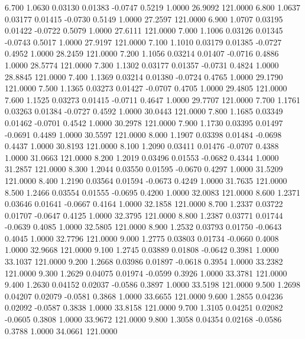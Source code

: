    6.700   1.0630   0.03130   0.01383  -0.0747   0.5219   1.0000  26.9092 121.0000
   6.800   1.0637   0.03177   0.01415  -0.0730   0.5149   1.0000  27.2597 121.0000
   6.900   1.0707   0.03195   0.01422  -0.0722   0.5079   1.0000  27.6111 121.0000
   7.000   1.1006   0.03126   0.01345  -0.0743   0.5017   1.0000  27.9197 121.0000
   7.100   1.1010   0.03179   0.01385  -0.0727   0.4952   1.0000  28.2459 121.0000
   7.200   1.1056   0.03214   0.01407  -0.0716   0.4886   1.0000  28.5774 121.0000
   7.300   1.1302   0.03177   0.01357  -0.0731   0.4824   1.0000  28.8845 121.0000
   7.400   1.1369   0.03214   0.01380  -0.0724   0.4765   1.0000  29.1790 121.0000
   7.500   1.1365   0.03273   0.01427  -0.0707   0.4705   1.0000  29.4805 121.0000
   7.600   1.1525   0.03273   0.01415  -0.0711   0.4647   1.0000  29.7707 121.0000
   7.700   1.1761   0.03263   0.01384  -0.0727   0.4592   1.0000  30.0443 121.0000
   7.800   1.1685   0.03349   0.01462  -0.0701   0.4542   1.0000  30.2978 121.0000
   7.900   1.1730   0.03395   0.01497  -0.0691   0.4489   1.0000  30.5597 121.0000
   8.000   1.1907   0.03398   0.01484  -0.0698   0.4437   1.0000  30.8193 121.0000
   8.100   1.2090   0.03411   0.01476  -0.0707   0.4388   1.0000  31.0663 121.0000
   8.200   1.2019   0.03496   0.01553  -0.0682   0.4344   1.0000  31.2857 121.0000
   8.300   1.2044   0.03550   0.01595  -0.0670   0.4297   1.0000  31.5209 121.0000
   8.400   1.2190   0.03564   0.01594  -0.0673   0.4249   1.0000  31.7635 121.0000
   8.500   1.2466   0.03554   0.01555  -0.0695   0.4200   1.0000  32.0083 121.0000
   8.600   1.2371   0.03646   0.01641  -0.0667   0.4164   1.0000  32.1858 121.0000
   8.700   1.2337   0.03722   0.01707  -0.0647   0.4125   1.0000  32.3795 121.0000
   8.800   1.2387   0.03771   0.01744  -0.0639   0.4085   1.0000  32.5805 121.0000
   8.900   1.2532   0.03793   0.01750  -0.0643   0.4045   1.0000  32.7796 121.0000
   9.000   1.2775   0.03803   0.01734  -0.0660   0.4008   1.0000  32.9668 121.0000
   9.100   1.2745   0.03889   0.01808  -0.0642   0.3981   1.0000  33.1037 121.0000
   9.200   1.2668   0.03986   0.01897  -0.0618   0.3954   1.0000  33.2382 121.0000
   9.300   1.2629   0.04075   0.01974  -0.0599   0.3926   1.0000  33.3781 121.0000
   9.400   1.2630   0.04152   0.02037  -0.0586   0.3897   1.0000  33.5198 121.0000
   9.500   1.2698   0.04207   0.02079  -0.0581   0.3868   1.0000  33.6655 121.0000
   9.600   1.2855   0.04236   0.02092  -0.0587   0.3838   1.0000  33.8158 121.0000
   9.700   1.3105   0.04251   0.02082  -0.0605   0.3808   1.0000  33.9672 121.0000
   9.800   1.3058   0.04354   0.02168  -0.0586   0.3788   1.0000  34.0661 121.0000
